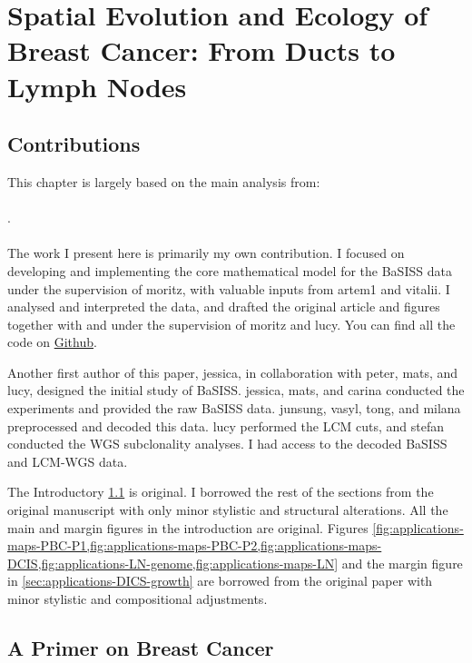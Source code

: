 \chapter{Spatial Evolution and Ecology of Breast Cancer: From Ducts to Lymph Nodes}
\label{sec:chapter-basiss-applications}

\section*{Contributions}
This chapter is largely based on the main analysis from:
\\~\\
 . 
\\~\\
The work I present here is primarily my own contribution. I focused on developing and implementing the core mathematical model for the \acs{BaSISS} data under the supervision of \ac{moritz}, with valuable inputs from \ac{artem1} and \ac{vitalii}. I analysed and interpreted the data, and drafted the original article and figures together with and under the supervision of \ac{moritz} and \ac{lucy}. You can find all the code on \href{https://github.com/gerstung-lab/BaSISS}{Github}.

Another first author of this paper, \ac{jessica}, in collaboration with \ac{peter}, \ac{mats}, and \ac{lucy}, designed the initial study of \acs{BaSISS}. \ac{jessica}, \ac{mats}, and \ac{carina} conducted the experiments and provided the raw \acs{BaSISS} data. \ac{junsung}, \ac{vasyl}, \ac{tong}, and \ac{milana} preprocessed and decoded this data. \ac{lucy} performed the \acs{LCM} cuts, and \ac{stefan} conducted the \acs{WGS} subclonality analyses. I had access to the decoded \acs{BaSISS} and \acs{LCM}-\acs{WGS} data.

The Introductory \cref{sec:applications-breast-intro} is original. I borrowed the rest of the sections from the original manuscript with only minor stylistic and structural alterations. All the main and margin figures in the introduction are original. Figures \cref{fig:applications-maps-PBC-P1,fig:applications-maps-PBC-P2,fig:applications-maps-DCIS,fig:applications-LN-genome,fig:applications-maps-LN} and the margin figure in \cref{sec:applications-DICS-growth} are borrowed from the original paper with minor stylistic and compositional adjustments.

\section{A Primer on Breast Cancer}
\label{sec:applications-breast-intro}

